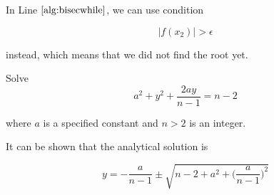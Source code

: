 \documentclass[]{book}
\theoremstyle{definition}
\theoremstyle{definition}
\theoremstyle{definition}
\theoremstyle{remark}
\let\BeginKnitrBlock\begin \let\EndKnitrBlock\end
\begin{document}
In Line \(\ref{alg:bisecwhile}\), we can use condition

\[\lvert f(x_2) \rvert > \epsilon\]

instead, which means that we did not find the root yet.

\BeginKnitrBlock{example}
\protect\hypertarget{exm:bisecexm}{}{\label{exm:bisecexm} }Solve \[a^2 + y^2 + \frac{2ay}{n - 1} = n - 2\]

where \(a\) is a specified constant and \(n > 2\) is an integer.
\EndKnitrBlock{example}

\BeginKnitrBlock{solution}
{}It can be shown that the analytical solution is

\[y = - \frac{a}{n - 1} \pm \sqrt{n - 2 + a^2 + \Big( \frac{a}{n - 1} \Big)^2}\]
\EndKnitrBlock{solution}
\end{document}
